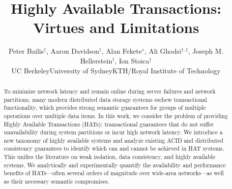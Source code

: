 \documentclass{vldb}
\theoremstyle{definition}
\begin{document}

\title{Highly Available Transactions: Virtues and Limitations}
{\author{Peter Bailis{\fontsize{12}{14}$^\dagger$}, Aaron Davidson{\fontsize{12}{14}$^\dagger$}, Alan Fekete{\fontsize{12}{14}$^\diamond$}, Ali Ghodsi{\fontsize{12}{14}$^{\dagger,\ddagger}$}, Joseph M. Hellerstein{\fontsize{12}{14}$^\dagger$}, Ion Stoica{\fontsize{12}{14}$^\dagger$}\\{\affaddr{\fontsize{12}{14}$^\dagger$}\hspace{.5mm}UC Berkeley\hspace{4mm}{\fontsize{12}{14}$^\diamond$}\hspace{.5mm}University of Sydney\hspace{4mm}{\fontsize{12}{14}$^\ddagger$}\hspace{.5mm}KTH/Royal Institute of Technology}}}
\maketitle

\begin{abstract}
To minimize network latency and remain online during server failures
and network partitions, many modern distributed data storage systems
eschew transactional functionality, which provides strong semantic
guarantees for groups of multiple operations over multiple data
items. In this work, we consider the problem of providing Highly
Available Transactions (HATs): transactional guarantees that do not
suffer unavailability during system partitions or incur high network
latency.  We introduce a new taxonomy of highly available systems and
analyze existing ACID and distributed consistency guarantees to
identify which can and cannot be achieved in HAT systems. This unifies
the literature on weak isolation, data consistency, and highly
available systems. We analytically and experimentally quantify the
availability and performance benefits of HATs---often several orders
of magnitude over wide-area networks---as well as their necessary
semantic compromises.
\end{abstract}












\end{document}
